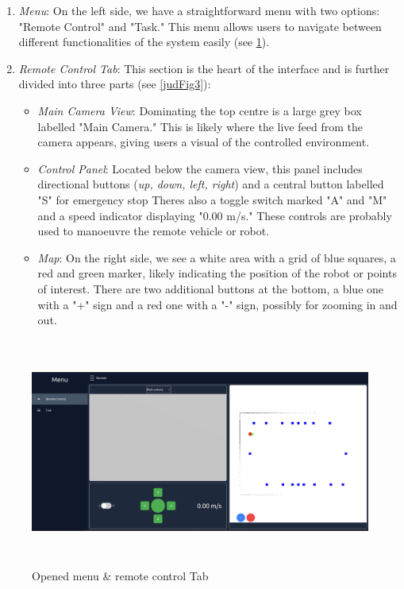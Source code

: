 \documentclass[a4paper,12pt]{extreport}
\begin{document}
    \begin{enumerate}
    \def\labelenumi{\arabic{enumi}.}
    \item
      \emph{Menu}: On the left side, we have a straightforward menu with two
      options: "Remote Control" and "Task." This menu allows users to
      navigate between different functionalities of the system easily (see
      \cref{judFig2}).
    \item
      \emph{Remote Control Tab}: This section is the heart of the interface
      and is further divided into three parts (see \cref{judFig3}):
    
      \begin{itemize}
      \item
        \emph{Main Camera View}: Dominating the top centre is a large grey
        box labelled "Main Camera." This is likely where the live feed from
        the camera appears, giving users a visual of the controlled
        environment.
      \item
        \emph{Control Panel}: Located below the camera view, this panel
        includes directional buttons (\emph{up, down, left, right}) and a
        central button labelled "S" for emergency stop
        There\textquotesingle s also a toggle switch marked "A" and "M" and
        a speed indicator displaying "0.00 m/s." These controls are probably
        used to manoeuvre the remote vehicle or robot.
      \item
        \emph{Map}: On the right side, we see a white area with a grid of
        blue squares, a red and green marker, likely indicating the position
        of the robot or points of interest. There are two additional buttons
        at the bottom, a blue one with a "+" sign and a red one with a "-"
        sign, possibly for zooming in and out.
      \end{itemize}
    \end{enumerate}
    
    \begin{figure}
    \centering
    \includegraphics[width=6.26806in,height=2.95417in]{img/image003.png}
    \caption{Opened menu \& remote control Tab}
    \label{judFig2}
    \end{figure}
    
\end{document}
